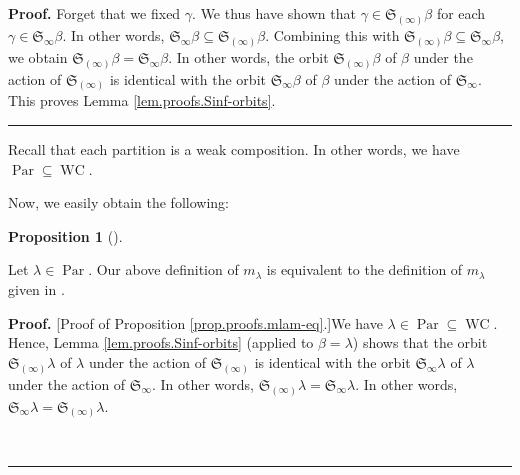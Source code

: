 \documentclass[numbers=enddot,12pt,final,onecolumn,notitlepage]{scrartcl}%
\theoremstyle{definition}
\newtheorem{prop}[theo]{Proposition}
\newenvironment{proposition}[1][]
{\begin{prop}[#1]\begin{leftbar}}
{\end{leftbar}\end{prop}}
\newenvironment{proof}[1][Proof]{\noindent\textbf{#1.} }{\ \rule{0.5em}{0.5em}}
\newenvironment{verlong}{}{}
\begin{document}
\begin{verlong}
\begin{proof}
Forget that we fixed $\gamma$. We thus have shown that $\gamma\in
\mathfrak{S}_{\left(  \infty\right)  }\beta$ for each $\gamma\in
\mathfrak{S}_{\infty}\beta$. In other words, $\mathfrak{S}_{\infty}%
\beta\subseteq\mathfrak{S}_{\left(  \infty\right)  }\beta$. Combining this
with $\mathfrak{S}_{\left(  \infty\right)  }\beta\subseteq\mathfrak{S}%
_{\infty}\beta$, we obtain $\mathfrak{S}_{\left(  \infty\right)  }%
\beta=\mathfrak{S}_{\infty}\beta$. In other words, the orbit $\mathfrak{S}%
_{\left(  \infty\right)  }\beta$ of $\beta$ under the action of $\mathfrak{S}%
_{\left(  \infty\right)  }$ is identical with the orbit $\mathfrak{S}_{\infty
}\beta$ of $\beta$ under the action of $\mathfrak{S}_{\infty}$. This proves
Lemma \ref{lem.proofs.Sinf-orbits}.
\end{proof}

Recall that each partition is a weak composition. In other words, we have
$\operatorname*{Par}\subseteq\operatorname*{WC}$.

Now, we easily obtain the following:

\begin{proposition}
\label{prop.proofs.mlam-eq}Let $\lambda\in\operatorname*{Par}$. Our above
definition of $m_{\lambda}$ is equivalent to the definition of $m_{\lambda}$
given in \cite[Definition 2.1.3]{GriRei}.
\end{proposition}

\begin{proof}
[Proof of Proposition \ref{prop.proofs.mlam-eq}.]We have $\lambda
\in\operatorname*{Par}\subseteq\operatorname*{WC}$. Hence, Lemma
\ref{lem.proofs.Sinf-orbits} (applied to $\beta=\lambda$) shows that the orbit
$\mathfrak{S}_{\left(  \infty\right)  }\lambda$ of $\lambda$ under the action
of $\mathfrak{S}_{\left(  \infty\right)  }$ is identical with the orbit
$\mathfrak{S}_{\infty}\lambda$ of $\lambda$ under the action of $\mathfrak{S}%
_{\infty}$. In other words, $\mathfrak{S}_{\left(  \infty\right)  }%
\lambda=\mathfrak{S}_{\infty}\lambda$. In other words, $\mathfrak{S}_{\infty
}\lambda=\mathfrak{S}_{\left(  \infty\right)  }\lambda$.


\end{proof}
\end{verlong}
\end{document}
